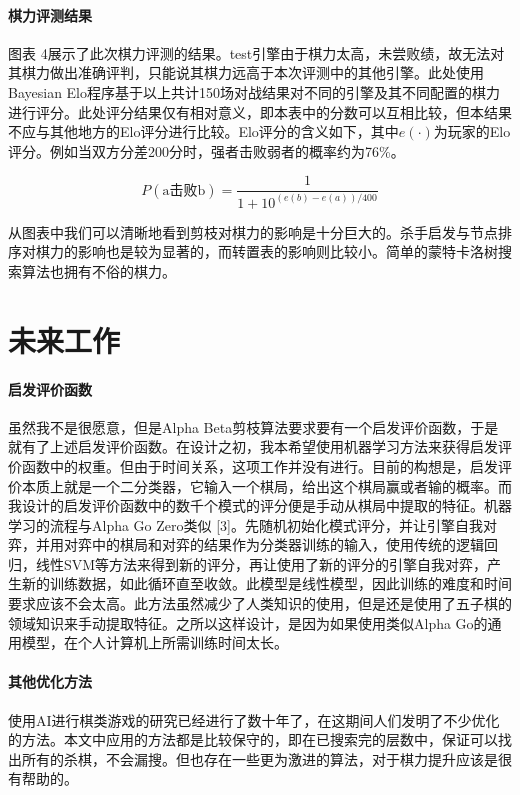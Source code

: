 \documentclass{ctexart}
\begin{document}
\paragraph{棋力评测结果} 图表 4展示了此次棋力评测的结果。test引擎由于棋力太高，未尝败绩，故无法对其棋力做出准确评判，只能说其棋力远高于本次评测中的其他引擎。此处使用Bayesian Elo程序基于以上共计150场对战结果对不同的引擎及其不同配置的棋力进行评分。此处评分结果仅有相对意义，即本表中的分数可以互相比较，但本结果不应与其他地方的Elo评分进行比较。Elo评分的含义如下，其中$e(\cdot)$为玩家的Elo评分。例如当双方分差200分时，强者击败弱者的概率约为76\%。

\begin{equation}
    P(\text{a击败b})=\frac{1}{1+10^{(e(b)-e(a))/400}}
\end{equation}

从图表中我们可以清晰地看到剪枝对棋力的影响是十分巨大的。杀手启发与节点排序对棋力的影响也是较为显著的，而转置表的影响则比较小。简单的蒙特卡洛树搜索算法也拥有不俗的棋力。

\section{未来工作}
\paragraph{启发评价函数} 虽然我不是很愿意，但是Alpha Beta剪枝算法要求要有一个启发评价函数，于是就有了上述启发评价函数。在设计之初，我本希望使用机器学习方法来获得启发评价函数中的权重。但由于时间关系，这项工作并没有进行。目前的构想是，启发评价本质上就是一个二分类器，它输入一个棋局，给出这个棋局赢或者输的概率。而我设计的启发评价函数中的数千个模式的评分便是手动从棋局中提取的特征。机器学习的流程与Alpha Go Zero类似 [3]。先随机初始化模式评分，并让引擎自我对弈，并用对弈中的棋局和对弈的结果作为分类器训练的输入，使用传统的逻辑回归，线性SVM等方法来得到新的评分，再让使用了新的评分的引擎自我对弈，产生新的训练数据，如此循环直至收敛。此模型是线性模型，因此训练的难度和时间要求应该不会太高。此方法虽然减少了人类知识的使用，但是还是使用了五子棋的领域知识来手动提取特征。之所以这样设计，是因为如果使用类似Alpha Go的通用模型，在个人计算机上所需训练时间太长。

\paragraph{其他优化方法} 使用AI进行棋类游戏的研究已经进行了数十年了，在这期间人们发明了不少优化的方法。本文中应用的方法都是比较保守的，即在已搜索完的层数中，保证可以找出所有的杀棋，不会漏搜。但也存在一些更为激进的算法，对于棋力提升应该是很有帮助的。
\end{document}
